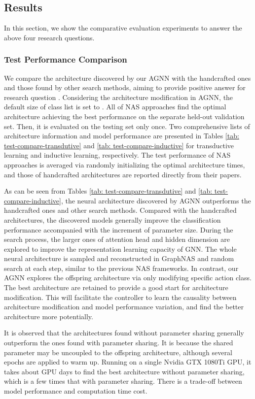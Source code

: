 \documentclass[sigconf]{acmart}
\begin{document}
\subsection{Results}
In this section, we show the comparative evaluation experiments to answer the above four research questions. 
\subsubsection{\textbf{Test Performance Comparison}}
We compare the architecture discovered by our AGNN with the handcrafted ones and those found by other search methods, aiming to provide positive answer for research question . Considering the architecture modification in AGNN, the default size  of class list  is set to . All of NAS approaches find the optimal architecture achieving the best performance on the separate held-out validation set. Then, it is evaluated on the testing set only once. Two comprehensive lists of architecture information and model performance are presented in Tables \ref{tab: test-compare-transdutive} and \ref{tab: test-compare-inductive} for transductive learning and inductive learning, respectively. The test performance of NAS approaches is averaged via randomly initializing the optimal architecture  times, and those of handcrafted architectures are reported directly from their papers. 

As can be seen from Tables \ref{tab: test-compare-transdutive} and \ref{tab: test-compare-inductive}, the neural architecture discovered by AGNN outperforms the handcrafted ones and other search methods. Compared with the handcrafted architectures, the discovered models generally improve the classification performance accompanied with the increment of parameter size. During the search process, the larger ones of attention head and hidden dimension are explored to improve the representation learning capacity of GNN. The whole neural architecture is sampled and reconstructed in GraphNAS and random search at each step, similar to the previous NAS frameworks. In contrast, our AGNN explores the offspring architecture via only modifying specific action class. The best architecture are retained to provide a good start for architecture modification. This will facilitate the controller to learn the causality between architecture modification and model performance variation, and find the better architecture more potentially. 


It is observed that the architectures found without parameter sharing generally outperform the ones found with parameter sharing. It is because the shared parameter may be  uncoupled to the offspring architecture, although several epochs are applied to warm up. Running on a single Nvidia GTX 1080Ti GPU, it takes about  GPU days to find the best architecture without parameter sharing, which is a few times that with parameter sharing. There is a trade-off between model performance and computation time cost. 
\end{document}
